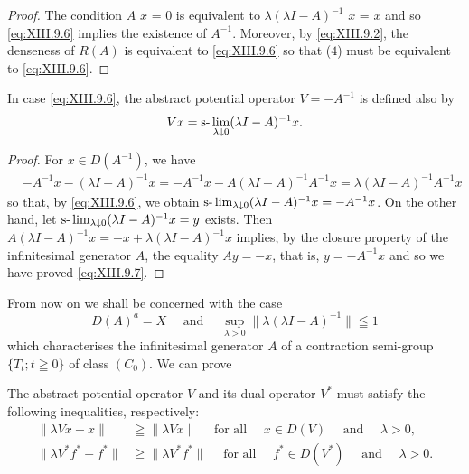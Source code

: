 \begin{proof}
 The condition $A$ $x$ = $0$ is equivalent to $\lambda(\lambda I - A)^{-1}$ $x$ = $x$ and so \eqref{eq:XIII.9.6} implies the existence of $A^{-1}$. Moreover, by \eqref{eq:XIII.9.2}, the denseness of $R(A)$ is equivalent to \eqref{eq:XIII.9.6} so that ($4$) must be equivalent to \eqref{eq:XIII.9.6}. 
\end{proof}

\begin{corollaryu} In case \eqref{eq:XIII.9.6}, the abstract potential operator $V = -A^{-1}$ is defined also by 
\begin{equation}\label{eq:XIII.9.7}
V x = \text{s-}\lim _{\lambda \downarrow 0} (\lambda I - A) ^{-1} x.
\end{equation}
\end{corollaryu}

\begin{proof}
 For $x \in D(A^{-1})$, we have 
\[
\begin{aligned}
&- A ^{-1} x - (\lambda I - A) ^{-1} x  = - A ^{-1} x - A (\lambda I - A) ^{-1} A ^{-1} x = \lambda (\lambda I - A) ^{-1} A ^{-1} x
\end{aligned}
\]
so that, by \eqref{eq:XIII.9.6}, we obtain $\text{s-}\lim\nolimits_{\lambda \downarrow 0} (\lambda I - A)^{-1} x = -A^{-1}x$. On the other hand, let $\text{s-}\lim\nolimits_{\lambda \downarrow 0} (\lambda I - A)^{-1} x = y$ exists. Then $A(\lambda I - A)^{-1} x = -x + \lambda (\lambda I - A)^{-1} x$ implies, by the closure property of the infinitesimal generator $A$, the equality $A y = -x$, that is, $y = -A^{-1}x$ and so we have proved \eqref{eq:XIII.9.7}. 
\end{proof}

From now on we shall be concerned with the case 
\begin{equation}\label{eq:XIII.9.8}
D (A) ^{a} = X \quad \text{ and } \quad \sup\limits _{\lambda > 0} \| \lambda (\lambda I - A) ^{-1} \| \leqq 1
\end{equation}
which characterises the infinitesimal generator $A$ of a contraction semi-group $\{T_{t}; t \geqq 0\}$ of class $(C_{0})$. We can prove 

\begin{theorem}\label{thm:XIII.9.Theorem.1} The abstract potential operator $V$ and its dual operator $V^{*}$ must satisfy the following inequalities, respectively: 
\begin{align}
\| \lambda V x + x \|& \geqq \| \lambda V x \| \quad \text{ for all } \quad x \in D (V) \quad \text{ and } \quad \lambda > 0, \label{eq:XIII.9.9} \\
\| \lambda V ^{*} f ^{*} + f ^{*} \|& \geqq \| \lambda V ^{*} f ^{*} \| \quad \text{ for all } \quad f ^{*} \in D (V ^{*}) \quad \text{ and } \quad \lambda > 0. \label{eq:XIII.9.10}
\end{align}
\end{theorem}

